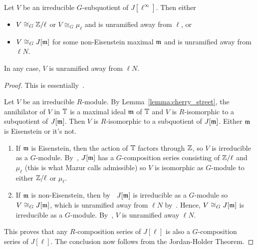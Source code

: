 \documentclass{article}
\begin{document}
\begin{theorem}\label{theorem:irreducible_G_sub}
    Let $V$ be an irreducible $G$-subquotient of $J[\ell^\infty]$. Then either
    \begin{itemize}
        \item
            $V\cong_G \mathbb{Z}/\ell$ or $V\cong_G \mu_\ell$ and is unramified away
            from $\ell$, or
        \item 
            $V\cong_G J[\mathfrak{m}]$ for some non-Eisenstein maximal $\mathfrak{m}$ and is
            unramified away from $\ell N$.
    \end{itemize}
    In any case, $V$ is unramified away from $\ell N$.
\end{theorem}
\begin{proof}
    This is essentially~\cite[\S 14]{mazur:eisenstein}.

    Let $V$ be an irreducible $R$-module. By Lemma~\ref{lemma:cherry_street},
    the annihilator of $V$ in $\mathbb{T}$ is a maximal ideal $\mathfrak{m}$ of $\mathbb{T}$ and $V$ is
    $R$-isomorphic to a subquotient of $J[\mathfrak{m}]$. Then $V$
    is $R$-isomorphic to a subquotient of $J[\mathfrak{m}]$. Either $\mathfrak{m}$ is Eisenstein or
    it's not.
    \begin{enumerate}
        \item
            If $\mathfrak{m}$ is Eisenstein, then the action of $\mathbb{T}$ factors through
            $\mathbb{Z}$, so $V$ is irreducible as a $G$-module. By~\cite[Proposition
            14.1]{mazur:eisenstein}, $J[\mathfrak{m}]$ has a $G$-composition series
            consisting of $\mathbb{Z}/\ell$ and $\mu_\ell$ (this is what Mazur calls
            admissible) so $V$ is isomorphic as $G$-module to either $\mathbb{Z}/\ell$
            or $\mu_\ell$.
        \item
            If $\mathfrak{m}$ is non-Eisenstein, then by~\cite[Proposition
            14.2]{mazur:eisenstein} $J[\mathfrak{m}]$ is irreducible as a $G$-module so
            $V\cong_G J[\mathfrak{m}]$, which is unramified away from $\ell N$
            by~\cite[Theorem 6.7]{deligne-serre}. Hence, $V\cong_G J[\mathfrak{m}]$ is
            irreducible as a $G$-module. By~\cite[Theorem 6.7]{deligne-serre},
            $V$ is unramified away $\ell N$.
    \end{enumerate}
    This proves that any $R$-composition series of $J[\ell]$ is also a
    $G$-composition series of $J[\ell]$. The conclusion now follows from the
    Jordan-Holder Theorem.
\end{proof} 
\end{document}
